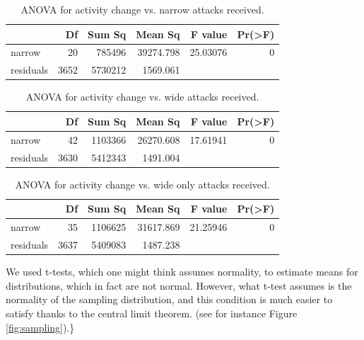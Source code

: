 \documentclass[10pt,]{scrartcl}
\begin{document}
\normalsize

\begin{table}[h!]

\begin{tabular}{l|r|r|r|r|r}
\hline
  & Df & Sum Sq & Mean Sq & F value & Pr(>F)\\
\hline
narrow & 20 & 785496 & 39274.798 & 25.03076 & 0\\
\hline
residuals & 3652 & 5730212 & 1569.061 &  & \\
\hline
\end{tabular}
\caption{ANOVA for activity change vs. narrow attacks received.}
\label{tab:anovanarrow}
\end{table}

\begin{table}[h!]

\begin{tabular}{l|r|r|r|r|r}
\hline
  & Df & Sum Sq & Mean Sq & F value & Pr(>F)\\
\hline
narrow & 42 & 1103366 & 26270.608 & 17.61941 & 0\\
\hline
residuals & 3630 & 5412343 & 1491.004 &  & \\
\hline
\end{tabular}
\caption{ANOVA for activity change vs. wide attacks received.}
\label{tab:anovawide}
\end{table}

\begin{table}[h!]

\begin{tabular}{l|r|r|r|r|r}
\hline
  & Df & Sum Sq & Mean Sq & F value & Pr(>F)\\
\hline
narrow & 35 & 1106625 & 31617.869 & 21.25946 & 0\\
\hline
residuals & 3637 & 5409083 & 1487.238 &  & \\
\hline
\end{tabular}
\caption{ANOVA for activity change vs. wide only attacks received.}
\label{tab:anovawideonly}
\end{table}

We used t-tests, which one might think assumes normality, to estimate
means for distributions, which in fact are not normal. However, what
t-test assumes is the normality of the sampling distribution, and this
condition is much easier to satisfy thanks to the central limit theorem.
(see for instance Figure \ref{fig:sampling}).\}

\footnotesize
\end{document}
